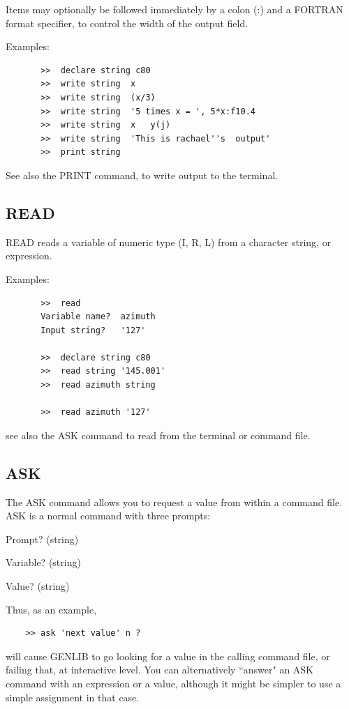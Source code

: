 \documentclass[11pt,twoside]{report}
\begin{document}
Items may optionally be followed immediately by a colon (:\index{:}) and a
FORTRAN format specifier, to control the width of the
output field. 

Examples:  
\begin{verbatim}
       >>  declare string c80
       >>  write string  x
       >>  write string  (x/3)
       >>  write string  '5 times x = ', 5*x:f10.4
       >>  write string  x   y(j)
       >>  write string  'This is rachael''s  output'
       >>  print string
\end{verbatim}

See also the PRINT command, to write output to the terminal.

\subsection{READ}

READ reads a variable of numeric type (I, R, L) from a character string,
or expression.

Examples:  
\begin{verbatim}
       >>  read
       Variable name?  azimuth
       Input string?   '127'

       >>  declare string c80
       >>  read string '145.001'
       >>  read azimuth string

       >>  read azimuth '127'
\end{verbatim}

see also the ASK command to read from the terminal or command file.

\subsection{ASK}

The ASK command allows you to request a value from within a command file.
ASK is a normal command with three prompts:
\begin{description}
\item {Prompt?}         (string)
\item {Variable?}       (string)
\item {Value?}          (string)
\end{description}

Thus, as an example,
\begin{verbatim}
    >> ask 'next value' n ?
\end{verbatim}
will cause GENLIB to go looking for a value in the calling command file, or
failing that, at interactive level. You can alternatively ``answer" an ASK
command with an expression or a value, although it might be simpler to use a
simple assignment in that case.
\end{document}
